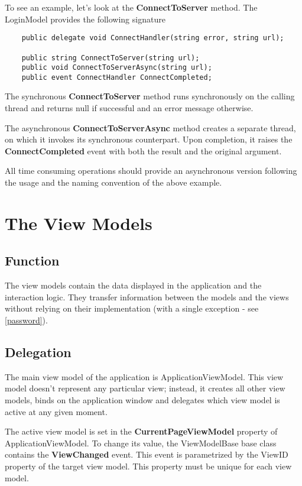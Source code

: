 \documentclass[titlepage]{scrartcl}
\begin{document}
To see an example, let's look at the \textbf{ConnectToServer} method. The LoginModel provides the following signature
\begin{verbatim}
    public delegate void ConnectHandler(string error, string url);

    public string ConnectToServer(string url);
    public void ConnectToServerAsync(string url);
    public event ConnectHandler ConnectCompleted;
\end{verbatim}

The synchronous \textbf{ConnectToServer} method runs synchronously on the calling thread and returns null if successful and an error message otherwise. 

The asynchronous \textbf{ConnectToServerAsync} method creates a separate thread, on which it invokes its synchronous counterpart. Upon completion, it raises the \textbf{ConnectCompleted} event with both the result and the original argument.

All time consuming operations should provide an asynchronous version following the usage and the naming convention of the above example.

\section{The View Models}
\subsection{Function}
The view models contain the data displayed in the application and the interaction logic. They transfer information between the models and the views without relying on their implementation (with a single exception - see \ref{password}).

\subsection{Delegation}
The main view model of the application is ApplicationViewModel. This view model doesn't represent any particular view; instead, it creates all other view models, binds on the application window and delegates which view model is active at any given moment. 

The active view model is set in the \textbf{CurrentPageViewModel} property of ApplicationViewModel. To change its value, the ViewModelBase base class contains the \textbf{ViewChanged} event. This event is parametrized by the ViewID property of the target view model. This property must be unique for each view model.
\end{document}
